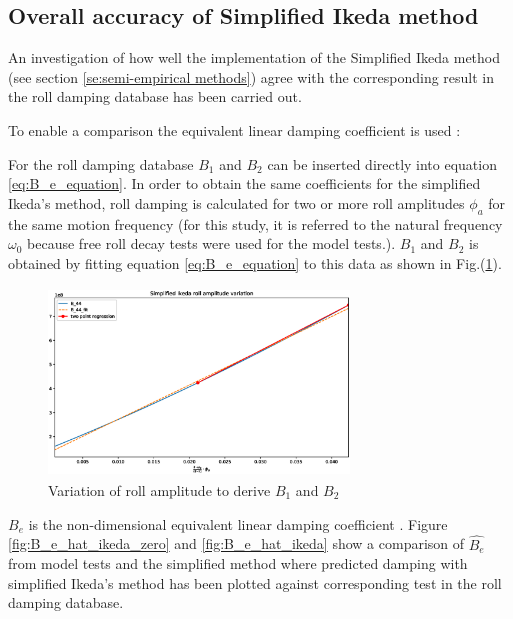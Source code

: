 \subsection{Overall accuracy of Simplified Ikeda method}
\label{se:overall_comparison}
An investigation of how well the implementation of the Simplified Ikeda method (see section \ref{se:semi-empirical methods}) agree with the corresponding result in the roll damping database has been carried out. 

To enable a comparison the equivalent linear damping coefficient is used \parencite{himeno_prediction_1981}:


For the roll damping database $B_1$ and $B_2$ can be inserted directly into equation  \ref{eq:B_e_equation}. 
In order to obtain the same coefficients for the simplified Ikeda's method, roll damping is calculated for two or more roll amplitudes $\phi_a$ for the same motion frequency (for this study, it is referred to the natural frequency $\omega_0$ because free roll decay tests were used for the model tests.). $B_1$ and $B_2$ is obtained by fitting equation \ref{eq:B_e_equation} to this data as shown in Fig.(\ref{fig:ikeda_B_1_B2}).  

\begin{figure}[H]
    \centering
    \includegraphics[height=5cm, width=8cm]{figures/ikeda_B_1_B_2.eps}
    \vspace{-0.5cm}
    \caption{Variation of roll amplitude to derive $B_1$ and $B_2$}
    \label{fig:ikeda_B_1_B2}
\end{figure}

$\hat{B_e}$ is the non-dimensional equivalent linear damping coefficient \parencite{himeno_prediction_1981}.
Figure \ref{fig:B_e_hat_ikeda_zero} and \ref{fig:B_e_hat_ikeda} show a comparison of $\hat{B_e}$ from model tests and the simplified method where predicted damping with simplified Ikeda's method has been plotted against corresponding test in the roll damping database.  

